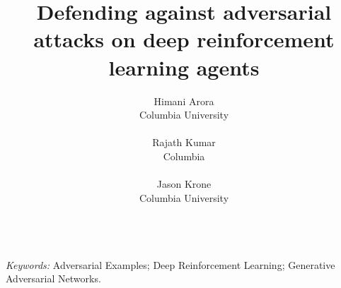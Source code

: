 \documentclass[12pt]{article}
\title{%
\textbf{Defending against adversarial attacks on deep reinforcement learning agents}
}
\author{
Himani Arora \\
Columbia University \\
\\
Rajath Kumar\\
Columbia\\
\\
Jason Krone\\
Columbia University \\
\\
}
\begin{document}
\maketitle
\bigskip



\emph{Keywords:}
Adversarial Examples;
Deep Reinforcement Learning;
Generative Adversarial Networks.

\clearpage
\glsresetall{}



\clearpage



\clearpage



\clearpage



\clearpage



\clearpage






\clearpage
\appendix

%
\end{document}
